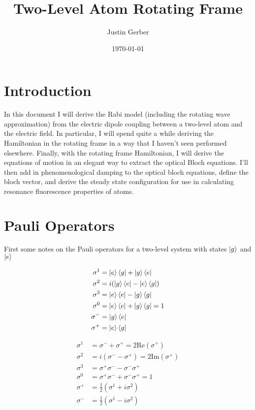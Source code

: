 \documentclass[12pt]{article}
\begin{document}
	\title{Two-Level Atom Rotating Frame}
	\author{Justin Gerber}
	\date{\today}
	\maketitle

\section{Introduction}

In this document I will derive the Rabi model (including the rotating wave approximation) from the electric dipole coupling between a two-level atom and the electric field. In particular, I will spend quite a while deriving the Hamiltonian in the rotating frame in a way that I haven't seen performed elsewhere. Finally, with the rotating frame Hamiltonian, I will derive the equations of motion in an elegant way to extract the optical Bloch equations. I'll then add in phenomenological damping to the optical bloch equations, define the bloch vector, and derive the steady state configuration for use in calculating resonance fluorescence properties of atoms.

\section{Pauli Operators}

First some notes on the Pauli operators for a two-level system with states $\ket{g}$ and $\ket{e}$

\begin{align}
\sigma^1 &= \ket{e}\bra{g} + \ket{g}\bra{e}\\
\sigma^2 &= i(\ket{g}\bra{e} - \ket{e}\bra{g})\\
\sigma^3 &= \ket{e}\bra{e} - \ket{g}\bra{g}\\
\sigma^0 &= \ket{e}\bra{e} + \ket{g}\bra{g} = 1\\
\sigma^- &= \ket{g}\bra{e}\\
\sigma^+ &= \ket{e}\bra{g}
\end{align}

\begin{align}
\sigma^1 &= \sigma^- + \sigma^+ = 2\text{Re}(\sigma^+)\\
\sigma^2 &= i(\sigma^- - \sigma^+) = 2\text{Im}(\sigma^+)\\
\sigma^3 &= \sigma^+\sigma^- - \sigma^-\sigma^+\\
\sigma^0 &= \sigma^+\sigma^- + \sigma^-\sigma^+ = 1\\ 
\sigma^+ &= \frac{1}{2}(\sigma^1 + i \sigma^2)\\
\sigma^- &= \frac{1}{2}(\sigma^1 - i \sigma^2)\\
\end{align}
\end{document}
